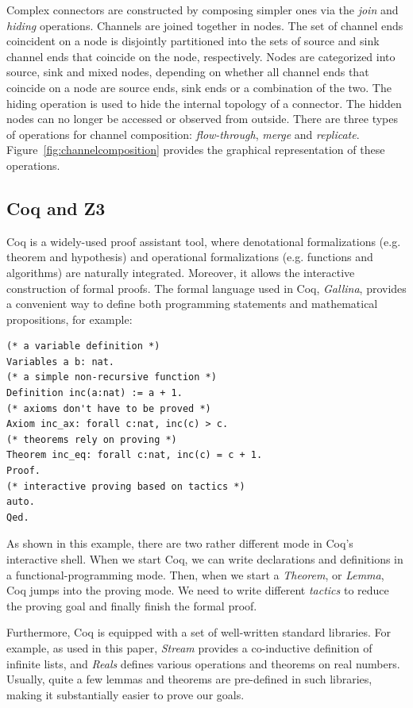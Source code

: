 \documentclass[preprint,3p]{elsarticle}
\begin{document}
Complex connectors are constructed by composing simpler ones via the \emph{join} and \emph{hiding} operations. Channels are joined together in nodes. The set of channel ends coincident on a node is disjointly partitioned into the sets of source and sink channel ends that coincide on the node, respectively. Nodes are categorized into source, sink and mixed nodes, depending on whether all channel ends that coincide on a node are source ends, sink ends or a combination of the two. The hiding operation is used to hide the internal topology of a connector. The hidden nodes can no longer be accessed or observed from outside. There are three types of operations for channel composition: \emph{flow-through}, \emph{merge} and \emph{replicate}. Figure~\ref{fig:channelcomposition} provides the graphical representation of these operations.

\subsection{Coq and Z3}

Coq \cite{huet1997coq} is a widely-used proof assistant tool, where denotational formalizations (e.g.
theorem and hypothesis) and operational formalizations (e.g. functions and algorithms) are naturally
integrated. Moreover, it allows the interactive construction of formal proofs.
The formal language used in Coq, \emph{Gallina}, provides a convenient way to define
both programming statements and mathematical propositions, for example:
\begin{lstlisting}[language=coq]
(* a variable definition *)
Variables a b: nat.
(* a simple non-recursive function *)
Definition inc(a:nat) := a + 1.
(* axioms don't have to be proved *)
Axiom inc_ax: forall c:nat, inc(c) > c.
(* theorems rely on proving *)
Theorem inc_eq: forall c:nat, inc(c) = c + 1.
Proof.
(* interactive proving based on tactics *)
auto.
Qed.
\end{lstlisting}

As shown in this example, there are two rather different mode in Coq's interactive shell. When
we start Coq, we can write declarations and definitions in a functional-programming mode. Then, when
we start a \emph{Theorem}, or \emph{Lemma}, Coq jumps into the proving mode. We need to write
different \emph{tactics} to reduce the proving goal and finally finish the formal proof.

Furthermore, Coq is equipped with a set of well-written standard libraries. For example, as used in
this paper, \emph{Stream} provides a co-inductive
definition of infinite lists, and \emph{Reals} defines various operations and theorems on real
numbers. Usually, quite a few lemmas and theorems are pre-defined in such libraries, making it
substantially easier to prove our goals.
\end{document}
